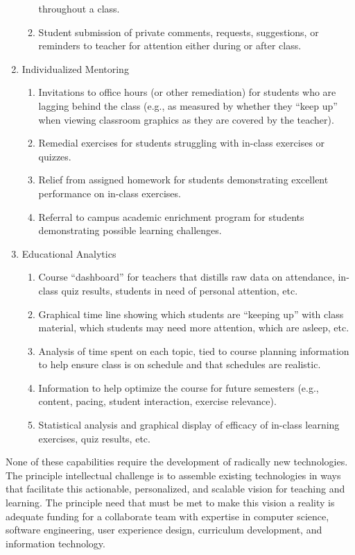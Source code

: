 \documentclass{article}
\begin{document}
\begin{enumerate}
\begin{enumerate}
    throughout a class.
  \item Student submission of private comments, requests, suggestions, or reminders to
    teacher for attention either during or after class.
  \end{enumerate}
\item{Individualized Mentoring}
  \begin{enumerate}
  \item Invitations to office hours (or other remediation) for students who are lagging
    behind the class (e.g., as measured by whether they ``keep up'' when viewing classroom
    graphics as they are covered by the teacher).
  \item Remedial exercises for students struggling with in-class exercises or quizzes.
  \item Relief from assigned homework for students demonstrating excellent performance on
    in-class exercises.
  \item Referral to campus academic enrichment program for students demonstrating possible
    learning challenges.
  \end{enumerate}
\item{Educational Analytics}
  \begin{enumerate}
  \item Course ``dashboard'' for teachers that distills raw data on attendance, in-class
    quiz results, students in need of personal attention, etc.
  \item Graphical time line showing which students are ``keeping up'' with class
    material, which students may need more attention, which are asleep, etc.
  \item Analysis of time spent on each topic, tied to course planning information to help
    ensure class is on schedule and that schedules are realistic.
  \item Information to help optimize the course for future semesters
    (e.g., content, pacing, student interaction, exercise relevance).
  \item Statistical analysis and graphical display of efficacy of in-class learning
    exercises, quiz results, etc.
  \end{enumerate}
\end{enumerate}

None of these capabilities require the development of radically new technologies.
The principle intellectual challenge is to assemble existing technologies
in ways that facilitate this actionable, personalized, and scalable vision for
teaching and learning.
The principle need that must be met to make this vision a reality
is adequate funding for a collaborate team with expertise in
computer science,
software engineering,
user experience design,
curriculum development,
and information technology.
\end{document}
